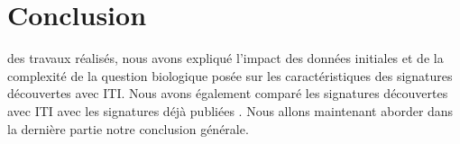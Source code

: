 	\section{\textcolor{blue!45!black}{Conclusion}}
		 des travaux réalisés, nous avons expliqué l'impact des données initiales et de la complexité de la question biologique posée sur les caractéristiques des signatures découvertes avec ITI.
		Nous avons également comparé les signatures découvertes avec ITI avec les signatures déjà publiées \citep{vandevijver2002,Wang2005, Sotiriou2006}.
		Nous allons maintenant aborder dans la dernière partie notre conclusion générale.
